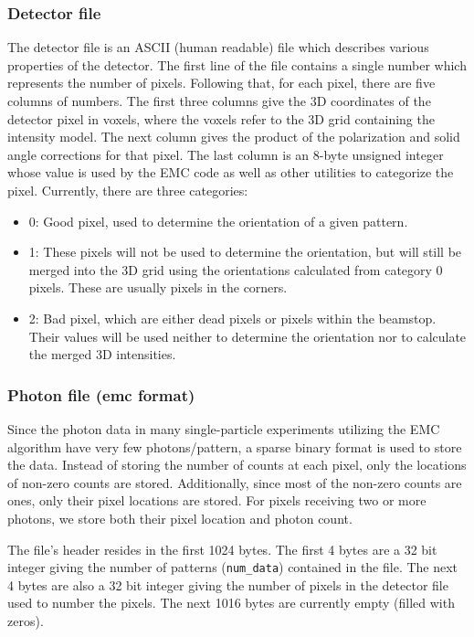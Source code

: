 \documentclass[preprint]{iucr}              %
\begin{document}
\subsubsection{Detector file}\label{subsubsec:detector}
The detector file is an ASCII (human readable) file which describes various properties of the detector. The first line of the file contains a single number which represents the number of pixels. Following that, for each pixel, there are five columns of numbers. The first three columns give the 3D coordinates of the detector pixel in voxels, where the voxels refer to the 3D grid containing the intensity model. The next column gives the product of the polarization and solid angle corrections for that pixel. The last column is an 8-byte unsigned integer whose value is used by the EMC code as well as other utilities to categorize the pixel. Currently, there are three categories:
\begin{itemize}
\item 0: Good pixel, used to determine the orientation of a given pattern.
\item 1: These pixels will not be used to determine the orientation, but will still be merged into the 3D grid using the orientations calculated from category 0 pixels. These are usually pixels in the corners.
\item 2: Bad pixel, which are either dead pixels or pixels within the beamstop. Their values will be used neither to determine the orientation nor to calculate the merged 3D intensities.
\end{itemize}

\subsubsection{Photon file (emc format)}\label{subsubsec:emcformat}
Since the photon data in many single-particle experiments utilizing the EMC algorithm have very few photons/pattern, a sparse binary format is used to store the data. Instead of storing the number of counts at each pixel, only the locations of non-zero counts are stored. Additionally, since most of the non-zero counts are ones, only their pixel locations are stored. For pixels receiving two or more photons, we store both their pixel location and photon count. 

The file's header resides in the first 1024 bytes. The first 4 bytes are a 32 bit integer giving the number of patterns (\texttt{num\_data}) contained in the file. The next 4 bytes are also a 32 bit integer giving the number of pixels in the detector file used to number the pixels. The next 1016 bytes are currently empty (filled with zeros).
\end{document}
